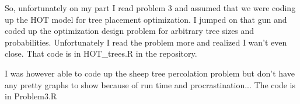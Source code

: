 So, unfortunately on my part I read problem 3 and assumed that we were coding up the HOT model for tree placement optimization. I jumped on that gun and coded up the optimization design problem for arbitrary tree sizes and probabilities. Unfortunately I read the problem more and realized I wan't even close. That code is in HOT\_trees.R in the repository.


I was however able to code up the sheep tree percolation problem but don't have any pretty graphs to show because of run time and procrastination... The code is in Problem3.R